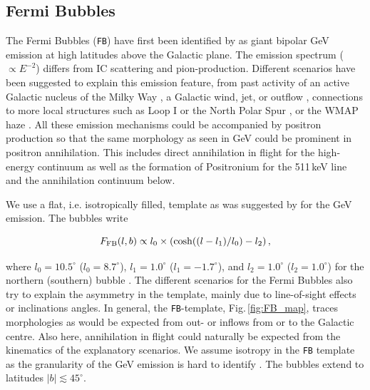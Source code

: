 \documentclass[doublespace,draft,nopageskip]{VTthesis} %
\newcommand{\mrm}[1]{\mathrm{#1}}
\begin{document}
\begin{appendices}
	
	\subsection{Fermi Bubbles}
	
	The Fermi Bubbles (\texttt{FB}) have first been identified by \citet{Su2010_fermibubbles} as giant bipolar GeV emission at high latitudes above the Galactic plane.
	The emission spectrum ($\propto E^{-2}$) differs from IC scattering and pion-production.
	Different scenarios have been suggested to explain this emission feature, from past activity of an active Galactic nucleus of the Milky Way \citep{Su2010_fermibubbles,Zubovas2012_FermiBubbles_AGN,Guo2012_FermiBubbles_AGN,Yang2017_FermiBubbles_AGN}, a Galactic wind, jet, or outflow \citep{Crocker2012_FermiBubbles_outflows,Sarkar2015_FermiBubbles_outflows,Lacki2014_FermiBubbles_outflows}, connections to more local structures such as Loop I or the North Polar Spur \citep{Kataoka2013_FermiBubbles_local,Sofue2015_NPS_Aquila_FermiBubbles,Ackermann2014_FermiBubbles}, or the WMAP haze \citep{Dobler2012_FermiBubbles_WMAPHaze,Ackermann2014_FermiBubbles,Crocker2015_FermiBubbles_WMAPHaze}.
	All these emission mechanisms could be accompanied by positron production so that the same morphology as seen in GeV could be prominent in positron annihilation.
	This includes direct annihilation in flight for the high-energy continuum as well as the formation of Positronium for the 511\,keV line and the annihilation continuum below.
	
	We use a flat, i.e. isotropically filled, template as was suggested by \citet{Macias2018_LATGeV} for the GeV emission.
	The bubbles write
	
	\begin{equation}
		F_{\rm FB}(l,b) \propto l_0 \times \left( \cosh((l-l_1)/l_0) - l_2 \right)\mrm{,}
		\label{eq:FB_formula}
	\end{equation}
	
	\noindent where $l_0 = 10.5^{\circ}$ ($l_0 = 8.7^{\circ}$), $l_1 = 1.0^{\circ}$ ($l_1 = -1.7^{\circ}$), and $l_2 = 1.0^{\circ}$ ($l_2 = 1.0^{\circ}$) for the northern (southern) bubble \citep{Acero2016_FermiLAT_sources}.
	The different scenarios for the Fermi Bubbles also try to explain the asymmetry in the template, mainly due to line-of-sight effects or inclinations angles.
	In general, the \texttt{FB}-template, Fig.\,\ref{fig:FB_map}, traces morphologies as would be expected from out- or inflows from or to the Galactic centre.
	Also here, annihilation in flight could naturally be expected from the kinematics of the explanatory scenarios.
	We assume isotropy in the \texttt{FB} template as the granularity of the GeV emission is hard to identify \citep{Ackermann2014_FermiBubbles}.
	The bubbles extend to latitudes $|b| \lesssim 45^{\circ}$.
	

\end{appendices}
\end{document}
